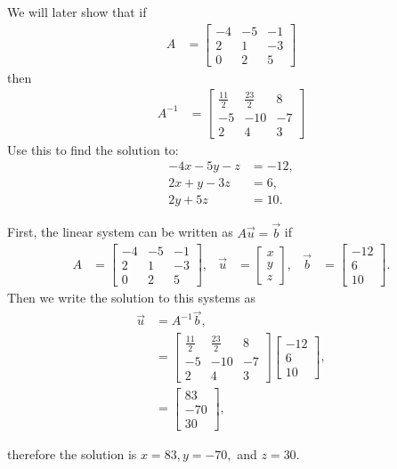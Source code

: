 \begin{example}
We will later show that if
%
\begin{align*}
A & = \begin{bmatrix}
-4 &  -5 &  -1 \\ 2 &  1 &  -3 \\ 0 &  2 &  5
\end{bmatrix}
\end{align*}
then
%
\begin{align*}
A^{-1} & = \begin{bmatrix}
\frac{11}{2} & \frac{23}{2} & 8 \\
-5 & -10 & -7 \\ 2 & 4 & 3
\end{bmatrix}
\end{align*}
Use this to find the solution to:
%
\begin{align*}
-4 x-5y -z & = -12, \\
2 x + y - 3 z & = 6, \\
2y + 5z & = 10.
\end{align*}

\solution

First, the linear system can be written as $A\vec{u}=\vec{b}$ if
\begin{align*}
	A & =
\begin{bmatrix}
	-4 & -5 & -1 \\
	2 &1 & -3 \\
	0 & 2 & 5
\end{bmatrix},
& \vec{u} & =
\begin{bmatrix}
	x \\ y\\ z
\end{bmatrix}, & \vec{b} & =
\begin{bmatrix}
	-12 \\ 6 \\ 10
\end{bmatrix}.
\end{align*}
Then we write the solution to this systems as
\begin{align*}
\vec{u} & = A^{-1} \vec{b}, \\
& = \begin{bmatrix}
\frac{11}{2} & \frac{23}{2} & 8 \\
-5 & -10 & -7 \\ 2 & 4 & 3
\end{bmatrix}
\begin{bmatrix}
-12 \\ 6 \\ 10
\end{bmatrix}, \\
& = \begin{bmatrix}
83 \\ -70 \\ 30
\end{bmatrix},
\end{align*}

therefore the solution is $x=83, y=-70,$ and $z=30$.


\end{example}


